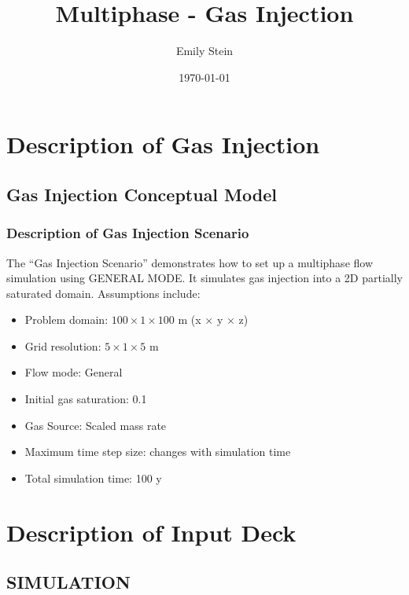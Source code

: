 \documentclass{beamer}
\begin{document}
\title{Multiphase - Gas Injection}
\author{Emily Stein}
\date{\today}


\section{Description of Gas Injection}

\subsection{Gas Injection Conceptual Model}

\begin{frame}\frametitle{Description of Gas Injection Scenario}
The ``Gas Injection Scenario'' demonstrates how to set up a multiphase flow simulation using GENERAL MODE. It simulates gas injection into a 2D partially saturated domain. Assumptions include:
\begin{itemize}
  \item Problem domain: $100 \times 1 \times 100$ m (x $\times$ y $\times$ z)
  \item Grid resolution: $5 \times 1 \times 5$ m 
  \item Flow mode: General
  \item Initial gas saturation: 0.1
  \item Gas Source: Scaled mass rate
  \item Maximum time step size: changes with simulation time
  \item Total simulation time: 100 y
\end{itemize}

\end{frame}

\section{Description of Input Deck}

\subsection{SIMULATION}
\end{document}
